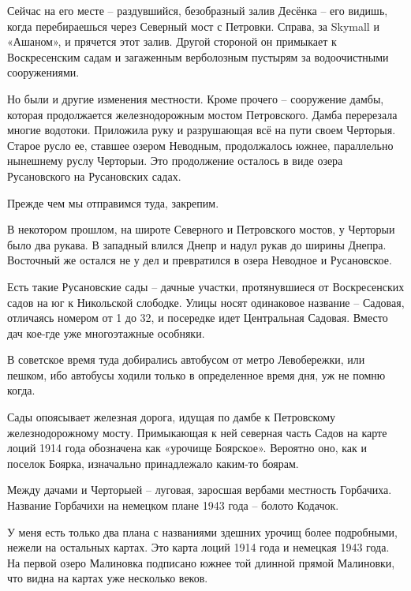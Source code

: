 Сейчас на его месте – раздувшийся, безобразный залив Десёнка – его видишь, когда перебираешься через Северный мост с Петровки. Справа, за Skymall и «Ашаном», и прячется этот залив. Другой стороной он примыкает к Воскресенским садам и загаженным верболозным пустырям за водоочистными сооружениями.

Но были и другие изменения местности. Кроме прочего – сооружение дамбы, которая продолжается железнодорожным мостом Петровского. Дамба перерезала многие водотоки. Приложила руку и разрушающая всё на пути своем Черторыя. Старое русло ее, ставшее озером Неводным, продолжалось южнее, параллельно нынешнему руслу Черторыи. Это продолжение осталось в виде озера Русановского на Русановских садах.

Прежде чем мы отправимся туда, закрепим.

В некотором прошлом, на широте Северного и Петровского мостов, у Черторыи было два рукава. В западный влился Днепр и надул рукав до ширины Днепра. Восточный же остался не у дел и превратился в озера Неводное и Русановское.
  
Есть такие Русановские сады – дачные участки, протянувшиеся от Воскресенских садов на юг к Никольской слободке. Улицы носят одинаковое название – Садовая, отличаясь номером от 1 до 32, и посередке идет Центральная Садовая. Вместо дач кое-где уже многоэтажные особняки.

В советское время туда добирались автобусом от метро Левобережки, или пешком, ибо автобусы ходили только в определенное время дня, уж не помню когда.

Сады опоясывает железная дорога, идущая по дамбе к Петровскому железнодорожному мосту. Примыкающая к ней северная часть Садов на карте лоций 1914 года обозначена как «урочище Боярское». Вероятно оно, как и поселок Боярка, изначально принадлежало каким-то боярам.

Между дачами и Черторыей – луговая, заросшая вербами местность Горбачиха. Название Горбачихи на нем\-ецком плане 1943 года – болото Кодачок.


У меня есть только два плана с названиями здешних урочищ более подробными, нежели на остальных картах. Это карта лоций 1914 года и немецкая 1943 года. На первой озеро Малиновка подписано южнее той длинной прямой Малиновки, что видна на картах уже несколько веков. 

